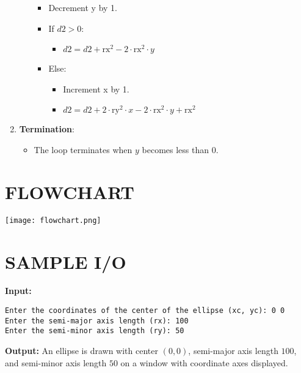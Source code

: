 \documentclass{article}
\begin{document}
\begin{enumerate}
\begin{itemize}
\begin{itemize}
            \item Decrement y by 1.
            \item If $d2 > 0$:
            \begin{itemize}
                \item $d2 = d2 + \text{rx}^2 - 2 \cdot \text{rx}^2 \cdot y$
            \end{itemize}
            \item Else:
            \begin{itemize}
                \item Increment x by 1.
                \item $d2 = d2 + 2 \cdot \text{ry}^2 \cdot x - 2 \cdot \text{rx}^2 \cdot y + \text{rx}^2$
            \end{itemize}
        \end{itemize}
    \end{itemize}
    \item \textbf{Termination}:
    \begin{itemize}
        \item The loop terminates when $y$ becomes less than 0.
    \end{itemize}
\end{enumerate}

\section*{FLOWCHART}
\begin{center}
\texttt{[image: flowchart.png]}
\end{center}

\section*{SAMPLE I/O}
\textbf{Input:}
\begin{verbatim}
Enter the coordinates of the center of the ellipse (xc, yc): 0 0
Enter the semi-major axis length (rx): 100
Enter the semi-minor axis length (ry): 50
\end{verbatim}

\textbf{Output:}
An ellipse is drawn with center $(0, 0)$, semi-major axis length $100$, and semi-minor axis length $50$ on a window with coordinate axes displayed.
\end{document}
